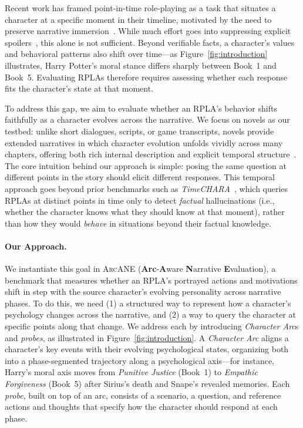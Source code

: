 \documentclass{llmxive}
\providecommand{\ours}{\textsc{ArcANE}}
\begin{document}
Recent work has framed point-in-time role-playing as a task that situates a character at a specific moment in their timeline, motivated by the need to preserve narrative immersion~\citep{Ryan:2008:ICIDS, Ryan:2003:Book, ahn-etal-2024-timechara}. While much effort goes into suppressing explicit spoilers~\cite{tu-etal-2024-charactereval, sadeq-etal-2024-mitigating}, this alone is not sufficient. Beyond verifiable facts, a character's values and behavioral patterns also shift over time---as Figure~\ref{fig:introduction} illustrates, Harry Potter's moral stance differs sharply between Book~1 and Book~5. Evaluating RPLAs therefore requires assessing whether each response fits the character's state at that moment.

To address this gap, we aim to evaluate whether an RPLA's behavior shifts faithfully as a character evolves across the narrative. We focus on novels as our testbed: unlike short dialogues, scripts, or game transcripts, novels provide extended narratives in which character evolution unfolds vividly across many chapters, offering both rich internal description and explicit temporal structure~\citep{wang2025coser}. The core intuition behind our approach is simple: posing the same question at different points in the story should elicit different responses. This temporal approach goes beyond prior benchmarks such as \emph{TimeCHARA}~\citep{ahn-etal-2024-timechara}, which queries RPLAs at distinct points in time only to detect \emph{factual} hallucinations (i.e., whether the character knows what they should know at that moment), rather than how they would \emph{behave} in situations beyond their factual knowledge.

\paragraph{Our Approach.}
We instantiate this goal in \ours{} (\textbf{Arc}-\textbf{A}ware \textbf{N}arrative \textbf{E}valuation), a benchmark that measures whether an RPLA's portrayed actions and motivations shift in step with the source character's evolving personality across narrative phases. To do this, we need (1) a structured way to represent how a character's psychology changes across the narrative, and (2) a way to query the character at specific points along that change. We address each by introducing \emph{Character Arc}s and \emph{probes}, as illustrated in Figure~\ref{fig:introduction}. A \emph{Character Arc} aligns a character's key events with their evolving psychological states, organizing both into a phase-segmented trajectory along a psychological axis---for instance, Harry's moral axis moves from \textit{Punitive Justice} (Book~1) to \textit{Empathic Forgiveness} (Book~5) after Sirius's death and Snape's revealed memories. Each \emph{probe}, built on top of an arc, consists of a scenario, a question, and reference actions and thoughts that specify how the character should respond at each phase.
\end{document}
